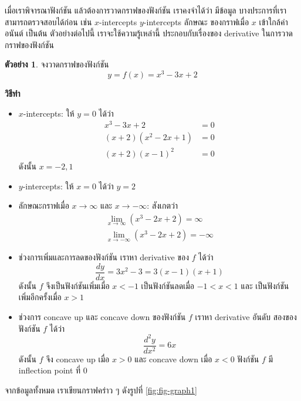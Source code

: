 \documentclass[
]{book}
\theoremstyle{definition}
\theoremstyle{definition}
\newtheorem{example}{ตัวอย่าง}[chapter]
\theoremstyle{definition}
\theoremstyle{definition}
\theoremstyle{remark}
\begin{document}
เมื่อเราพิจารณาฟังก์ชัน แล้วต้องการวาดกราฟของฟังก์ชัน เราคงจำได้ว่า มีข้อมูล
บางประการที่เราสามารถตรวจสอบได้ก่อน เช่น \(x\)-intercepts \(y\)-intercepts ลักษณะ
ของกราฟเมื่อ \(x\) เข้าใกล้ค่าอนันต์ เป็นต้น ตัวอย่างต่อไปนี้ เราจะใช้ความรู้เหล่านี้
ประกอบกับเรื่องของ derivative ในการวาดกราฟของฟังก์ชัน

\begin{example}
จงวาดกราฟของฟังก์ชัน \[y = f(x) =  x^3-3x+2\]
\end{example}

\textbf{วิธีทำ}

\begin{itemize}
\item
  \(x\)-intercepts: ให้ \(y=0\) ได้ว่า \begin{equation}   \begin{aligned}
      x^3-3x+2 &= 0 \\
      (x+2)(x^2-2x+1) &= 0 \\
      (x+2)(x-1)^2 &= 0
    \end{aligned} \end{equation} ดังนั้น \(x=-2, 1\)
\item
  \(y\)-intercepts: ให้ \(x=0\) ได้ว่า \(y=2\)
\item
  ลักษณะกราฟเมื่อ \(x \to \infty\) และ \(x \to -\infty\): สังเกตว่า
  \begin{equation}   \begin{aligned}
      \lim_{x\to \infty} (x^3-2x+2) = \infty \\
      \lim_{x\to -\infty} (x^3-2x+2) = -\infty
    \end{aligned} \end{equation}
\item
  ช่วงการเพิ่มและการลดของฟังก์ชัน เราหา derivative ของ \(f\) ได้ว่า
  \[\frac{dy}{dx} = 3x^2-3 = 3(x-1)(x+1)\] ดังนั้น \(f\) จึงเป็นฟังก์ชันเพิ่มเมื่อ
  \(x < -1\) เป็นฟังก์ชันลดเมื่อ \(-1 < x < 1\) และ เป็นฟังก์ชันเพิ่มอีกครั้งเมื่อ \(x>1\)
\item
  ช่วงการ concave up และ concave down ของฟังก์ชัน \(f\) เราหา derivative
  อันดับ สองของฟังก์ชัน \(f\) ได้ว่า \[\frac{d^2y}{dx^2} = 6x\] ดังนั้น \(f\) จึง
  concave up เมื่อ \(x>0\) และ concave down เมื่อ \(x<0\) ฟังก์ชัน \(f\) มี
  inflection point ที่ \(0\)
\end{itemize}

จากข้อมูลทั้งหมด เราเขียนกราฟคร่าว ๆ ดังรูปที่ \ref{fig:fig-graph1}
\end{document}
